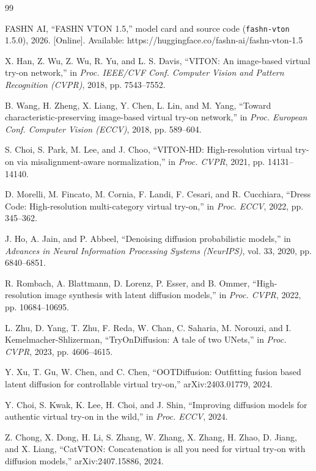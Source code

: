 \begin{thebibliography}{99}
\setlength{\itemsep}{3pt}

 FASHN AI, ``FASHN VTON 1.5,'' model card and source code (\texttt{fashn-vton} 1.5.0), 2026. [Online]. Available: https://huggingface.co/fashn-ai/fashn-vton-1.5

 X. Han, Z. Wu, Z. Wu, R. Yu, and L. S. Davis, ``VITON: An image-based virtual try-on network,'' in \textit{Proc. IEEE/CVF Conf. Computer Vision and Pattern Recognition (CVPR)}, 2018, pp. 7543--7552.

 B. Wang, H. Zheng, X. Liang, Y. Chen, L. Lin, and M. Yang, ``Toward characteristic-preserving image-based virtual try-on network,'' in \textit{Proc. European Conf. Computer Vision (ECCV)}, 2018, pp. 589--604.

 S. Choi, S. Park, M. Lee, and J. Choo, ``VITON-HD: High-resolution virtual try-on via misalignment-aware normalization,'' in \textit{Proc. CVPR}, 2021, pp. 14131--14140.

 D. Morelli, M. Fincato, M. Cornia, F. Landi, F. Cesari, and R. Cucchiara, ``Dress Code: High-resolution multi-category virtual try-on,'' in \textit{Proc. ECCV}, 2022, pp. 345--362.

 J. Ho, A. Jain, and P. Abbeel, ``Denoising diffusion probabilistic models,'' in \textit{Advances in Neural Information Processing Systems (NeurIPS)}, vol. 33, 2020, pp. 6840--6851.

 R. Rombach, A. Blattmann, D. Lorenz, P. Esser, and B. Ommer, ``High-resolution image synthesis with latent diffusion models,'' in \textit{Proc. CVPR}, 2022, pp. 10684--10695.

 L. Zhu, D. Yang, T. Zhu, F. Reda, W. Chan, C. Saharia, M. Norouzi, and I. Kemelmacher-Shlizerman, ``TryOnDiffusion: A tale of two UNets,'' in \textit{Proc. CVPR}, 2023, pp. 4606--4615.

 Y. Xu, T. Gu, W. Chen, and C. Chen, ``OOTDiffusion: Outfitting fusion based latent diffusion for controllable virtual try-on,'' arXiv:2403.01779, 2024.

 Y. Choi, S. Kwak, K. Lee, H. Choi, and J. Shin, ``Improving diffusion models for authentic virtual try-on in the wild,'' in \textit{Proc. ECCV}, 2024.

 Z. Chong, X. Dong, H. Li, S. Zhang, W. Zhang, X. Zhang, H. Zhao, D. Jiang, and X. Liang, ``CatVTON: Concatenation is all you need for virtual try-on with diffusion models,'' arXiv:2407.15886, 2024.


\end{thebibliography}
